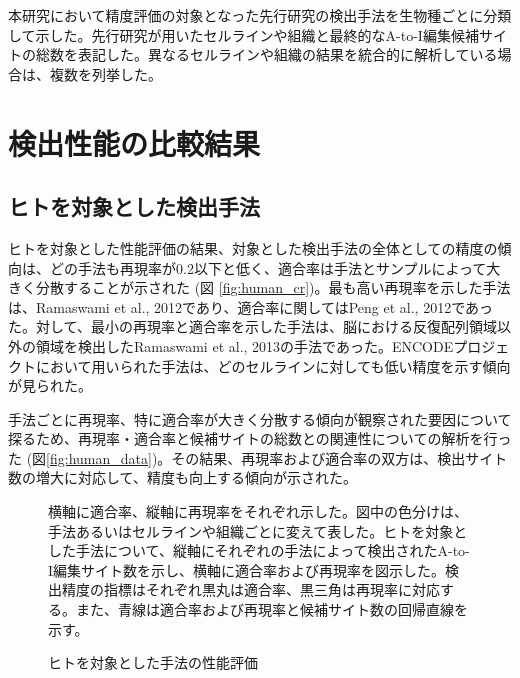 \begin{flushleft}
	\small{本研究において精度評価の対象となった先行研究の検出手法を生物種ごとに分類して示した。先行研究が用いたセルラインや組織と最終的なA-to-I編集候補サイトの総数を表記した。異なるセルラインや組織の結果を統合的に解析している場合は、複数を列挙した。}
\end{flushleft}

\section{検出性能の比較結果}
\subsection{ヒトを対象とした検出手法}
ヒトを対象とした性能評価の結果、対象とした検出手法の全体としての精度の傾向は、どの手法も再現率が0.2以下と低く、適合率は手法とサンプルによって大きく分散することが示された (図 \ref{fig:human_cr})。最も高い再現率を示した手法は、Ramaswami et al., 2012であり、適合率に関してはPeng et al., 2012であった。対して、最小の再現率と適合率を示した手法は、脳における反復配列領域以外の領域を検出したRamaswami et al., 2013の手法であった。ENCODEプロジェクトにおいて用いられた手法は、どのセルラインに対しても低い精度を示す傾向が見られた。
\par
手法ごとに再現率、特に適合率が大きく分散する傾向が観察された要因について探るため、再現率・適合率と候補サイトの総数との関連性についての解析を行った (図\ref{fig:human_data})。その結果、再現率および適合率の双方は、検出サイト数の増大に対応して、精度も向上する傾向が示された。

\begin{figure}[!h]
	\begin{minipage}{1\textwidth}
	    \centering
	\end{minipage}\hfill
	\caption{ヒトを対象とした手法の性能評価}
	\begin{flushleft}
		\small{\textbf{}横軸に適合率、縦軸に再現率をそれぞれ示した。図中の色分けは、手法あるいはセルラインや組織ごとに変えて表した。\textbf{}ヒトを対象とした手法について、縦軸にそれぞれの手法によって検出されたA-to-I編集サイト数を示し、横軸に適合率および再現率を図示した。検出精度の指標はそれぞれ黒丸は適合率、黒三角は再現率に対応する。また、青線は適合率および再現率と候補サイト数の回帰直線を示す。}
	\end{flushleft}
\end{figure}

